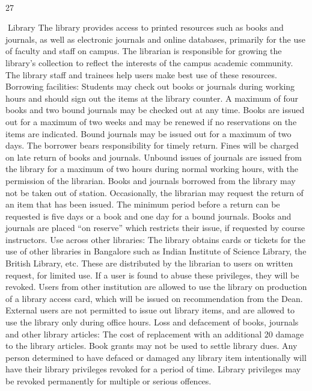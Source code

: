\documentclass[a4paper,10pt]{article}
\begin{document}
	
  

27	
  

Library
The library provides access to printed resources such as books and journals, as well as
electronic journals and online databases, primarily for the use of faculty and staff on
campus. The librarian is responsible for growing the library’s collection to reflect the
interests of the campus academic community. The library staff and trainees help users make
best use of these resources.
Borrowing facilities: Students may check out books or journals during working hours and
should sign out the items at the library counter. A maximum of four books and two bound
journals may be checked out at any time. Books are issued out for a maximum of two weeks
and may be renewed if no reservations on the items are indicated. Bound journals may be
issued out for a maximum of two days. The borrower bears responsibility for timely return.
Fines will be charged on late return of books and journals. Unbound issues of journals are
issued from the library for a maximum of two hours during normal working hours, with the
permission of the librarian. Books and journals borrowed from the library may not be taken
out of station. Occasionally, the librarian may request the return of an item that has been
issued. The minimum period before a return can be requested is five days or a book and one
day for a bound journals. Books and journals are placed “on reserve” which restricts their
issue, if requested by course instructors.
Use across other libraries: The library obtains cards or tickets for the use of other libraries
in Bangalore such as Indian Institute of Science Library, the British Library, etc. These are
distributed by the librarian to users on written request, for limited use. If a user is found to
abuse these privileges, they will be revoked. Users from other institution are allowed to use
the library on production of a library access card, which will be issued on recommendation
from the Dean. External users are not permitted to issue out library items, and are allowed to
use the library only during office hours.
Loss and defacement of books, journals and other library articles: The cost of
replacement with an additional 20%
damage to the library articles. Book grants may not be used to settle library dues. Any
person determined to have defaced or damaged any library item intentionally will have their
library privileges revoked for a period of time. Library privileges may be revoked
permanently for multiple or serious offences.
\end{document}
